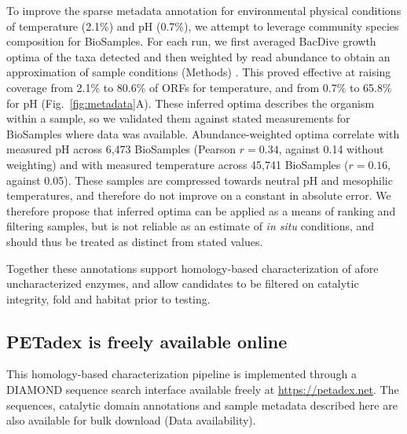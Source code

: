 \documentclass[pdflatex,sn-nature,iicol]{sn-jnl}%
\begin{document}
To improve the sparse metadata annotation for environmental physical conditions of temperature (2.1\%) and pH (0.7\%), we attempt to leverage community species composition for BioSamples. For each run, we first averaged BacDive growth optima of the taxa detected and then weighted by read abundance to obtain an approximation of sample conditions (Methods) \citep{reimer2022bacdive}. This proved effective at raising coverage from 2.1\% to 80.6\% of ORFs for temperature, and from 0.7\% to 65.8\% for pH (Fig.~\ref{fig:metadata}A). These inferred optima describes the organism within a sample, so we validated them against stated measurements for BioSamples where data was available. Abundance-weighted optima correlate with measured pH across 6,473 BioSamples (Pearson $r = 0.34$, against 0.14 without weighting) and with measured temperature across 45,741 BioSamples ($r = 0.16$, against 0.05). These samples are compressed towards neutral pH and mesophilic temperatures, and therefore do not improve on a constant in absolute error. We therefore propose that inferred optima can be applied as a means of ranking and filtering samples, but is not reliable as an estimate of \textit{in situ} conditions, and should thus be treated as distinct from stated values. 


Together these annotations support homology-based characterization of afore uncharacterized enzymes, and allow candidates to be filtered on catalytic integrity, fold and habitat prior to testing.

\subsection{PETadex is freely available online}

This homology-based characterization pipeline is implemented through a DIAMOND \citep{buchfink2021diamond} sequence search interface available freely at \url{https://petadex.net}. The sequences, catalytic domain annotations and sample metadata described here are also available for bulk download (Data availability).


\end{document}
